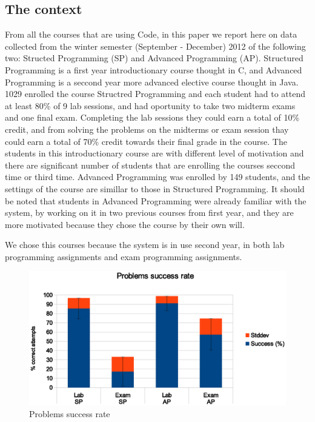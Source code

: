 \documentclass{llncs}
\begin{document}
\subsection{The context}

From all the courses that are using Code, in this paper we report here on data
collected from the winter semester (September - December) 2012 of the following
two: Structed Programming (SP) and Advanced Programming (AP). Structured
Programming is a first year introductionary course thought in C, and Advanced
Programming is a seccond year more advanced elective course thought in Java.
1029 enrolled the course Structred Programming and each student had to attend at
least 80\% of 9 lab sessions, and had oportunity to take two midterm exams and
one final exam. Completing the lab sessions they could earn a total of 10\%
credit, and from solving the problems on the midterms or exam session thay could
earn a total of 70\% credit towards their final grade in the course. The
students in this introductionary course are with different level of motivation
and there are significant number of students that are enrolling the courses
seccond time or third time. Advanced Programming was enrolled by 149 students,
and the settings of the course are simillar to those in Structured Programming.
It should be noted that students in Advanced Programming were already familiar
with the system, by working on it in two previous courses from first year, and
they are more motivated because they chose the course by their own will.

We chose this courses because the system is in use second year, in both lab
programming assignments and exam programming assignments.

\begin{figure}
\centering
\includegraphics[width=.99\textwidth]{code_usage/problems_success}
\caption{Problems success rate}
\label{fig:problems_success}
\end{figure}
\end{document}
